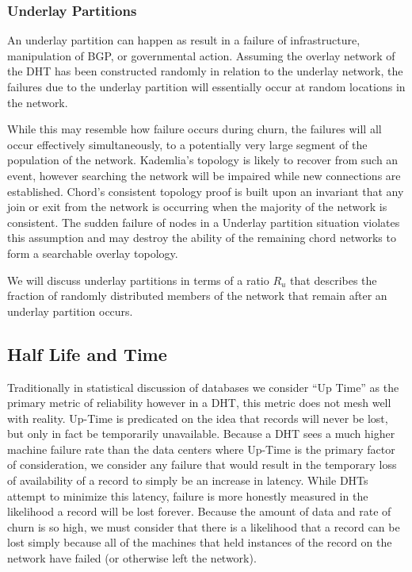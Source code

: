 \documentclass[conference]{IEEEtran}
\begin{document}
\subsubsection{Underlay Partitions}
An underlay partition can happen as result in a failure of infrastructure, manipulation of BGP, or governmental action.
Assuming the overlay network of the DHT has been constructed randomly in relation to the underlay network, the failures due to the underlay partition will essentially occur at random locations in the network. 


While this may resemble how failure occurs during churn, the failures will all occur effectively simultaneously, to a potentially very large segment of the population of the network.
Kademlia's topology is likely to recover from such an event, however searching the network will be impaired while new connections are established.
Chord's consistent topology proof is built upon an invariant that any join or exit from the network is occurring when the majority of the network is consistent. 
The sudden failure of nodes in a Underlay partition situation violates this assumption and may destroy the ability of the remaining chord networks to form a searchable overlay topology.

We will discuss underlay partitions in terms of a ratio $R_{u}$ that describes the fraction of randomly distributed members of the network that remain after an underlay partition occurs. 


\subsection{Half Life and Time}
Traditionally in statistical discussion of databases we consider ``Up Time'' as the primary metric of reliability however in a DHT, this metric does not mesh well with reality.
Up-Time is predicated on the idea that records will never be lost, but only in fact be temporarily unavailable.
Because a DHT sees a much higher machine failure rate than the data centers where Up-Time is the primary factor of consideration, we consider any failure that would result in the temporary loss of availability of a record to simply be an increase in latency.
While DHTs attempt to minimize this latency, failure is more honestly measured in the likelihood a record will be lost forever.
Because the amount of data and rate of churn is so high, we must consider that there is a likelihood that a record can be lost simply because all of the machines that held instances of the record on the network have failed (or otherwise left the network).
\end{document}
